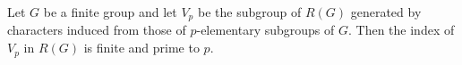 Let $G$ be a finite group and let $V_p$ be the subgroup of $R(G)$ generated by characters induced from those of $p$-elementary subgroups of $G$. Then the index of $V_p$ in $R(G)$ is finite and prime to $p$.
